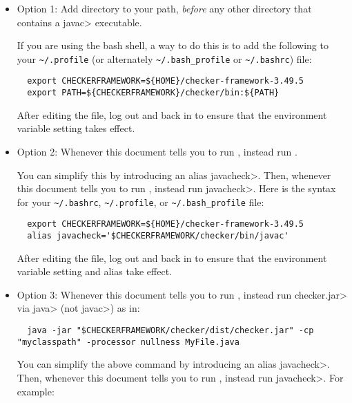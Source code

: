 \begin{itemize}
  \item
    Option 1:
    Add directory
     to your path, \emph{before} any other
    directory that contains a \<javac> executable.

    If you are
    using the bash shell, a way to do this is to add the following to your
    \verb|~/.profile| (or alternately \verb|~/.bash_profile| or \verb|~/.bashrc|) file:
\begin{Verbatim}
  export CHECKERFRAMEWORK=${HOME}/checker-framework-3.49.5
  export PATH=${CHECKERFRAMEWORK}/checker/bin:${PATH}
\end{Verbatim}

   After editing the file, log out and back in to ensure that the environment variable
   setting takes effect.

  \item
    \begin{sloppypar}
    Option 2:
    Whenever this document tells you to run ,
    instead run .
    \end{sloppypar}

    You can simplify this by introducing an alias \<javacheck>.  Then,
    whenever this document tells you to run , instead run
    \<javacheck>.  Here is the syntax for your
    \verb|~/.bashrc|, \verb|~/.profile|, or \verb|~/.bash_profile|
    file:
\begin{Verbatim}
  export CHECKERFRAMEWORK=${HOME}/checker-framework-3.49.5
  alias javacheck='$CHECKERFRAMEWORK/checker/bin/javac'
\end{Verbatim}

   After editing the file, log out and back in to ensure that the environment variable
   setting and alias take effect.

   \item
   Option 3:
   Whenever this document tells you to run , instead
   run \<checker.jar> via \<java> (not \<javac>) as in:

\begin{Verbatim}
  java -jar "$CHECKERFRAMEWORK/checker/dist/checker.jar" -cp "myclasspath" -processor nullness MyFile.java
\end{Verbatim}

    You can simplify the above command by introducing an alias
    \<javacheck>.  Then, whenever this document tells you to run
    , instead run \<javacheck>.  For example:


\end{itemize}
